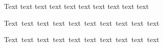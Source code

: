 \documentclass{article}
\begin{document}
  

Text text text text text text text text text text 

\hbox{Text text text text text text text text text text}

  

\hbox{Text text text text text text text text text text}
\end{document}
